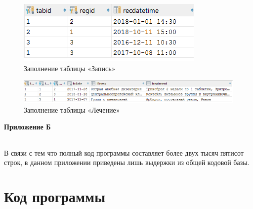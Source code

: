 \documentclass[14pt,a4paper,russian]{extreport}
\begin{document}
\vspace{0.00mm}

\begin{figure}[h]
        \center\includegraphics[scale=1]{appointment}
        \caption{Заполнение таблицы «Запись»}
        \label{fig:appointment}
\end{figure}

\begin{figure}[h!]
        \center\includegraphics[width=\textwidth]{treatment}
        \caption{Заполнение таблицы «Лечение»}
        \label{fig:treatment}
\end{figure}
\vfill
\phantom{0000}

\cleardoublepage
\hfill\textbf{Приложение Б}
\\
В связи с тем что полный код программы составляет более двух тысяч пятисот строк, в данном приложении приведены лишь выдержки из общей кодовой базы.

\section*{Код программы}



\end{document}
